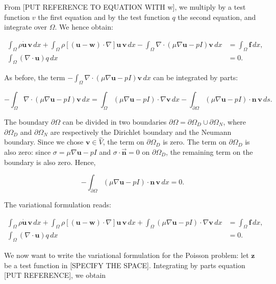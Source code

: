 \documentclass[11pt,a4paper,titlepage]{report}
\begin{document}

From [PUT REFERENCE TO EQUATION WITH w], we multiply by a test function $v$ the first equation and by the test function $q$ the second equation, and integrate over $\Omega$. We hence obtain:

\begin{align*}
\int_{\Omega} \rho \dot{\mathbf{u}} \, \mathbf{v} \, dx
+ \int_{\Omega} \rho [(\mathbf{u - w}) \cdot \nabla] \mathbf{u} \, \mathbf{v} \, dx
- \int_{\Omega} \nabla \cdot (\mu \nabla \mathbf{u} -  pI)\mathbf{v} \, dx
&=  \int_{\Omega} \mathbf{f} \, dx, \\
 \int_{\Omega}  (\nabla \cdot \mathbf{u}) q \, dx &= 0.
\end{align*}

As before, the term $- \int_{\Omega} \nabla \cdot (\mu \nabla \mathbf{u} - pI)\mathbf{v} \, dx$ can be integrated by parts:

\[
- \int_{\Omega} \nabla \cdot (\mu \nabla \mathbf{u} - pI)\mathbf{v} \, dx
=  \int_{\Omega} (\mu \nabla \mathbf{u} - pI) \cdot \nabla \mathbf{v} \, dx
- \int_{\partial \Omega} (\mu \nabla \mathbf{u} - pI) \cdot \mathbf{n} \, \mathbf{v} \, ds.
\]

The boundary $\partial \Omega$ can be divided in two boundaries $ \partial \Omega = \partial \Omega_D \cup \partial \Omega_N $, where $\partial \Omega_D$ and $\partial \Omega_N$ are respectively the Dirichlet boundary and the Neumann boundary.
Since we chose $\mathbf{v} \in \hat{V}$, the term on $\partial \Omega_{D}$ is zero. The term on $\partial \Omega_{D}$ is also zero: since $\sigma = \mu \nabla \mathbf{u} - pI$ and $\sigma \cdot \vec{\mathbf{n}} = 0$ on $\partial \Omega_{D}$, the remaining term on the boundary is also zero. Hence,

\[- \int_{\partial \Omega} (\mu \nabla \mathbf{u} - pI) \cdot \mathbf{n} \, \mathbf{v} \, dx = 0.\]

The variational formulation reads:

\begin{align*}
\int_{\Omega} \rho \dot{\mathbf{u}} \, \mathbf{v} \, dx
+ \int_{\Omega} \rho [(\mathbf{u - w}) \cdot \nabla] \mathbf{u} \, \mathbf{v} \, dx
+ \int_{\Omega} (\mu \nabla \mathbf{u} - pI) \cdot \nabla \mathbf{v} \, dx
&=  \int_{\Omega} \mathbf{f} \, dx,  \\
\int_{\Omega} ( \nabla \cdot \mathbf{u} ) q \, dx &= 0.
\end{align*}

We now want to write the variational formulation for the Poisson problem: let $\mathbf{z}$ be a test function in [SPECIFY THE SPACE]. Integrating by parts equation [PUT REFERENCE], we obtain
\end{document}
